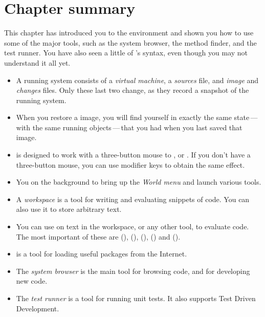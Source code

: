 \documentclass[a4paper,10pt,twoside]{book}
\begin{document}
\section{Chapter summary}
This chapter has introduced you to the \pharo environment and shown you how to use some of the major tools, such as the system browser, the method finder, and the test runner.   You have also seen a little of \pharo's syntax, even though you may not understand it all yet.

\begin{itemize}
  \item A running \pharo system consists of a \emph{virtual machine}, a \emph{sources} file, and \emph{image} and \emph{changes} files. Only these last two change, as they record a snapshot of the running system.
  \item When you restore a \pharo image, you will find yourself in exactly the same state\,---\,with the same running objects\,---\,that you had when you last saved that image.
  \item \pharo is designed to work with a three-button mouse to \click, \actclick or \metaclick.  If you don't have a three-button mouse, you can use modifier keys to obtain the same effect.
  \item You \click on the \pharo background to bring up the \emph{World menu} and launch various tools.
  \item A \emph{workspace} is a tool for writing and evaluating snippets of code. You can also use it to store arbitrary text.
  \item You can use  on text in the workspace, or any other tool, to evaluate code. The most important of these are  (),  (),  (),  () and  ().
  \item \sqmap is a tool for loading useful packages from the Internet.
  \item The \emph{system browser} is the main tool for browsing \pharo code, and for developing new code.
  \item The \emph{test runner} is a tool for running unit tests. It also supports Test Driven Development.
\end{itemize}

\ifx\wholebook\relax\else 
   
   
\end{document}
